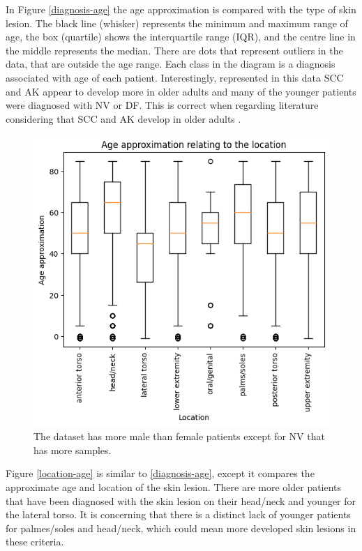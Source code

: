 In Figure \ref{diagnosis-age} the age approximation is compared with the type of skin lesion. The black line (whisker) represents the minimum and maximum range of age, the box (quartile) shows the interquartile range (IQR), and the centre line in the middle represents the median. There are dots that represent outliers in the data, that are outside the age range. Each class in the diagram is a diagnosis associated with age of each patient. Interestingly, represented in this data SCC and AK appear to develop more in older adults and many of the younger patients were diagnosed with NV or DF. This is correct when regarding literature considering that SCC and AK develop in older adults \cite{}.

\begin{figure}
	\centering
	\includegraphics[scale=0.8]{images/ISIC/location-age.png}
	\caption{The dataset has more male than female patients except for NV that has more samples.} 
\end{figure} \label{location-age}

Figure \ref{location-age} is similar to \ref{diagnosis-age}, except it compares the approximate age and location of the skin lesion. There are more older patients that have been diagnosed with the skin lesion on their head/neck and younger for the lateral torso. It is concerning that there is a distinct lack of younger patients for palmes/soles and head/neck, which could mean more developed skin lesions in these criteria.

